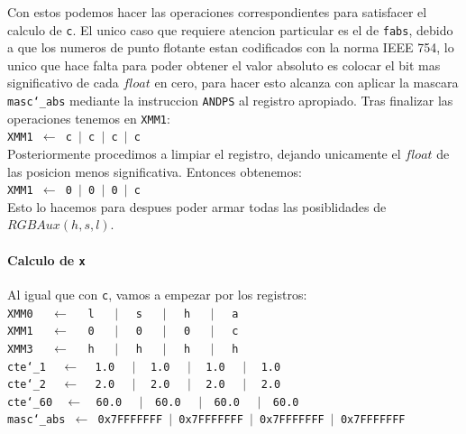 Con estos podemos hacer las operaciones correspondientes para satisfacer el calculo de \texttt{c}. El unico caso que requiere atencion particular es el de \texttt{fabs}, debido a que los numeros de punto flotante estan codificados con la norma IEEE 754, lo unico que hace falta para poder obtener el valor absoluto es colocar el bit mas significativo de cada $float$ en cero, para hacer esto alcanza con aplicar la mascara \texttt{masc\char`_abs} mediante la instruccion \texttt{ANDPS} al registro apropiado. Tras finalizar las operaciones tenemos en \texttt{XMM1}:\\

\noindent
\texttt{XMM1 $\gets$ c $\vert$ c $\vert$ c $\vert$ c}\\

Posteriormente procedimos a limpiar el registro, dejando unicamente el $float$ de las posicion menos significativa. Entonces obtenemos:\\

\noindent
\texttt{XMM1 $\gets$ 0 $\vert$ 0 $\vert$ 0 $\vert$ c}\\

Esto lo hacemos para despues poder armar todas las posiblidades de $RGBAux(h,s,l)$.

\paragraph{Calculo de \texttt{x}\newline}

Al igual que con \texttt{c}, vamos a empezar por los registros:\\

\noindent
\texttt{XMM0 $\ \ \ \ \gets \ \ \ \ $ l $\ \ \ \ \ \vert\ \ \ \ $ s $\ \ \ \ \ \vert\ \ \ \ $ h  $\ \ \ \ \ \vert\ \ \ \ $ a}\\
\texttt{XMM1 $\ \ \ \ \gets \ \ \ \ $ 0 $\ \ \ \ \ \vert\ \ \ \ $ 0 $\ \ \ \ \ \vert\ \ \ \ $ 0  $\ \ \ \ \ \vert\ \ \ \ $ c}\\
\texttt{XMM3 $\ \ \ \ \gets \ \ \ \ $ h $\ \ \ \ \ \vert\ \ \ \ $ h $\ \ \ \ \ \vert\ \ \ \ $ h  $\ \ \ \ \ \vert\ \ \ \ $ h}\\
\texttt{cte\char`_1 $\ \ \ \gets\ \ \ $ 1.0 $\ \ \ \ \vert\ \ \ $ 1.0 $\ \ \ \ \vert\ \ \ $ 1.0 $\ \ \ \ \vert\ \ \ $ 1.0}\\
\texttt{cte\char`_2 $\ \ \ \gets\ \ \ $ 2.0 $\ \ \ \ \vert\ \ \ $ 2.0 $\ \ \ \ \vert\ \ \ $ 2.0 $\ \ \ \ \vert \ \ \ $ 2.0}\\
\texttt{cte\char`_60 $\ \ \gets\ \ $ 60.0 $\ \ \ \ \vert\ \ $ 60.0 $\ \ \ \ \vert\ \ $ 60.0 $\ \ \ \ \vert \ \ $ 60.0}\\
\texttt{masc\char`_abs $\gets$ 0x7FFFFFFF $\vert$ 0x7FFFFFFF $\vert$ 0x7FFFFFFF $\vert$ 0x7FFFFFFF}\\

